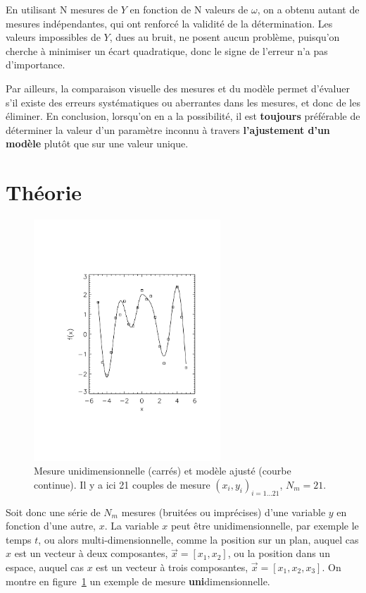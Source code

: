 En utilisant N mesures de $Y$ en fonction de N valeurs de $\omega$, on a obtenu autant de mesures indépendantes, qui ont renforcé la validité de la détermination. Les valeurs impossibles de $Y$, dues au bruit, ne posent aucun problème, puisqu'on cherche à minimiser un écart quadratique, donc le signe de l'erreur n'a pas d'importance.

Par ailleurs, la comparaison visuelle des mesures et du modèle permet d'évaluer s'il existe des erreurs systématiques ou aberrantes dans les mesures, et donc de les éliminer. En conclusion, lorsqu'on en a la possibilité, il est \textbf{toujours} préférable de déterminer la valeur d'un paramètre inconnu à travers \textbf{l'ajustement d'un modèle} plutôt que sur une valeur unique.

\section{Théorie}

\begin{figure}
   \centering
   \vspace{-5mm}
   \includegraphics[width=70mm]{assets/figures/exemple1D.pdf}
   \caption{Mesure unidimensionnelle (carrés) et modèle ajusté (courbe continue). Il y a ici 21 couples de mesure $(x_i,y_i)_{i=1\dots 21}$, $N_m=21$.}
   \label{fig:ex1}
\end{figure}
Soit donc une série de $N_m$ mesures (bruitées ou imprécises) d'une variable $y$ en fonction d'une autre, $x$. La variable $x$ peut être unidimensionnelle, par exemple le temps $t$, ou alors multi-dimensionnelle, comme la position sur un plan, auquel cas $x$ est un vecteur à deux composantes, $\vec{x}=[x_1,x_2]$, ou la position dans un espace, auquel cas $x$ est un vecteur à trois composantes, $\vec{x}=[x_1,x_2,x_3]$. On montre en figure~\ref{fig:ex1} un exemple de mesure \textbf{uni}dimensionnelle.

